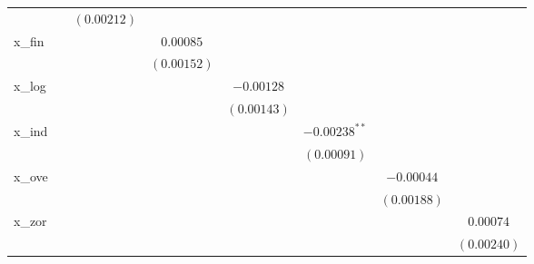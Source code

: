 \begin{center}
\begin{longtable}{l c c c c c c c }
            &             & $(0.00212)$     &               &             &                 &             &             \\
x\_fin      &             &                 & $0.00085$     &             &                 &             &             \\
            &             &                 & $(0.00152)$   &             &                 &             &             \\
x\_log      &             &                 &               & $-0.00128$  &                 &             &             \\
            &             &                 &               & $(0.00143)$ &                 &             &             \\
x\_ind      &             &                 &               &             & $-0.00238^{**}$ &             &             \\
            &             &                 &               &             & $(0.00091)$     &             &             \\
x\_ove      &             &                 &               &             &                 & $-0.00044$  &             \\
            &             &                 &               &             &                 & $(0.00188)$ &             \\
x\_zor      &             &                 &               &             &                 &             & $0.00074$   \\
            &             &                 &               &             &                 &             & $(0.00240)$ \\
\end{longtable}
\end{center}
